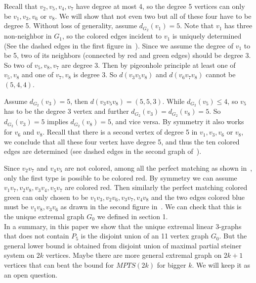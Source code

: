 \documentclass[a4paper]{article}
\begin{document}
Recall that $v_2,v_5,v_4,v_7$ have degree at most 4, so the degree 5 vertices can only be $v_1,v_3,v_6$ or $v_8$. We will show that not even two but all of these four have to be degree 5. Without loss of generality, assume $d_{G_2}(v_1)=5$. Note that $v_1$ has three non-neighbor in $G_1$, so the colored edges incident to $v_1$ is uniquely determined (See the dashed edges in the first figure in~). Since we assume the degree of $v_1$ to be 5, two of its neighbors (connected by red and green edges) should be degree 3. So two of $v_5,v_8,v_7$ are degree 3. Then by pigeonhole principle at least one of $v_5,v_8$ and one of $v_7,v_8$ is degree 3. So $d(v_3v_5v_8)$ and $d(v_6v_7v_8)$ cannot be $(5,4,4)$. 

Assume $d_{G_2}(v_3)=5$, then $d(v_3v_5v_8)=(5,5,3)$. While $d_{G_2}(v_5)\le4$, so $v_5$ has to be the degree 3 vertex and further $d_{G_2}(v_3)=d_{G_2}(v_8)=5$. So $d_{G_2}(v_3)=5$ implies $d_{G_2}(v_8)=5$, and vice versa. By symmetry it also works for $v_6$ and $v_8$. Recall that there is a second vertex of degree 5 in $v_1,v_3,v_6$ or $v_8$, we conclude that all these four vertex have degree 5, and thus the ten colored edges are determined (see dashed edges in the second graph of~).

Since $v_2v_7$ and $v_4v_5$ are not colored, among all the perfect matching as shown in~, only the first type is possible to be colored red. By symmetry we can assume $v_1v_7,v_2v_8,v_3v_4,v_5v_7$ are colored red. Then similarly the perfect matching colored green can only chosen to be $v_1v_3,v_2v_6,v_3v_7,v_4v_8$ and the two edges colored blue must be $v_1v_8,v_3v_6$ as drawn in the second figure in~. We can check that this is the unique extremal graph $G_0$ we defined in section 1.\hfill\qedsymbol\\

In a summary, in this paper we show that the unique extremal linear 3-graphs that does not contain $P_5$ is the disjoint union of an 11 vertex graph $G_0$. But the general lower bound is obtained from disjoint union of maximal partial steiner system on $2k$ vertices. Maybe there are more general extremal graph on $2k+1$ vertices that can beat the bound for $MPTS(2k)$ for bigger $k$. We will keep it as an open question.





\nocite{*}


\end{document}
